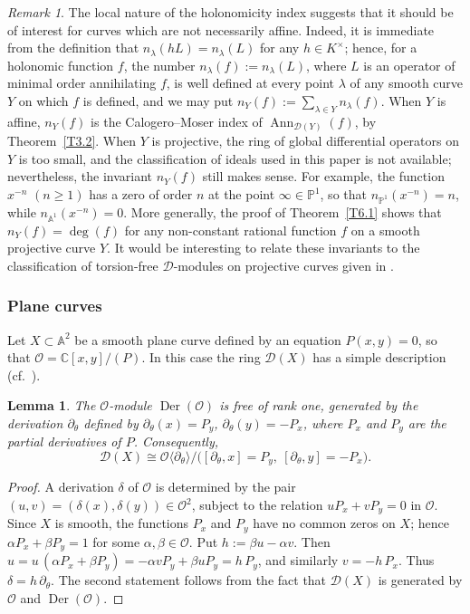 \documentclass[11pt,reqno]{amsart}
\theoremstyle{plain}
\newtheorem{lemma}{Lemma}[section]
\theoremstyle{definition}
\theoremstyle{remark}
\newtheorem*{remark}{Remark}
\numberwithin{equation}{section}
\newcommand{\cD}{\mathcal{D}}
\newcommand{\cO}{\mathcal{O}}
\newcommand{\C}{\mathbb{C}}
\newcommand{\A}{\mathbb{A}}
\newcommand{\del}{\partial}
\newcommand{\lan}{\langle}
\newcommand{\ran}{\rangle}
\DeclareMathOperator{\Ann}{Ann}
\DeclareMathOperator{\Der}{Der}
\begin{document}
\begin{remark}
The local nature of the holonomicity index suggests that it should be of interest for curves
which are not necessarily affine. Indeed, it is immediate from the definition that $n_\lambda(hL)
= n_\lambda(L)$ for any $h \in K^\times$; hence, for a holonomic function $f$, the number
$n_\lambda(f) := n_\lambda(L)$, where $L$ is an operator of minimal order annihilating $f$, is
well defined at every point $\lambda$ of any smooth curve $Y$ on which $f$ is defined, and we may
put $n_Y(f) := \sum_{\lambda \in Y} n_\lambda(f)$. When $Y$ is affine, $n_Y(f)$ is the
Calogero--Moser index of $\Ann_{\cD(Y)}(f)$, by Theorem~\ref{T3.2}. When $Y$ is projective, the
ring of global differential operators on $Y$ is too small, and the classification of ideals used
in this paper is not available; nevertheless, the invariant $n_Y(f)$ still makes sense. For
example, the function $x^{-n}$ $(n \ge 1)$ has a zero of order $n$ at the point $\infty \in
\mathbb{P}^1$, so that $n_{\mathbb{P}^1}(x^{-n}) = n$, while $n_{\A^1}(x^{-n}) = 0$. More
generally, the proof of Theorem~\ref{T6.1} shows that $n_Y(f) = \deg(f)$ for any non-constant
rational function $f$ on a smooth projective curve $Y$. It would be interesting to relate these
invariants to the classification of torsion-free $\cD$-modules on projective curves given in \cite{BenZviNevins}. %
\end{remark}

\subsubsection{Plane curves}
Let $X \subset \A^2$ be a smooth plane curve defined by an equation $P(x,y) = 0$, so that
$\cO = \C[x,y]/(P)$. In this case the ring $\cD(X)$ has a simple description (cf.\
\cite[Section~6.2.3]{BerestChalykhIdeals}).

\begin{lemma}
\label{L6.2}
The $\cO$-module $\Der(\cO)$ is free of rank one, generated by the derivation $\del_\theta$
defined by $\del_\theta(x) = P_y$, $\del_\theta(y) = - P_x$, where $P_x$ and $P_y$ are the partial
derivatives of $P$. Consequently,
\[
  \cD(X) \cong \cO\lan \del_\theta \ran \big/ \bigl( [\del_\theta, x] = P_y , \ [\del_\theta, y] =
  - P_x \bigr) .
\]
\end{lemma}

\begin{proof}
A derivation $\delta$ of $\cO$ is determined by the pair $(u, v) = (\delta(x), \delta(y)) \in
\cO^2$, subject to the relation $u P_x + v P_y = 0$ in $\cO$. Since $X$ is smooth, the functions
$P_x$ and $P_y$ have no common zeros on $X$; hence $\alpha P_x + \beta P_y = 1$ for some $\alpha,
\beta \in \cO$. Put $h := \beta u - \alpha v$. Then $u = u\,(\alpha P_x + \beta P_y) = - \alpha v
P_y + \beta u P_y = h\, P_y$, and similarly $v = - h\, P_x$. Thus $\delta = h\, \del_\theta$. The
second statement follows from the fact that $\cD(X)$ is generated by $\cO$ and $\Der(\cO)$.
\end{proof}
\end{document}
